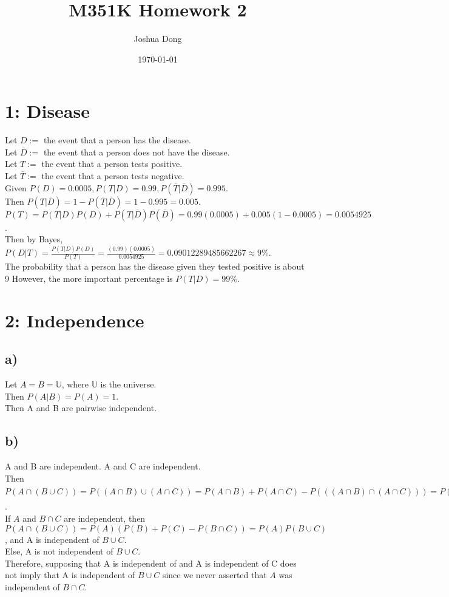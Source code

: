 \documentclass{article}
\begin{document}
\title{\vspace{-60px}M351K\: Homework 2}
\author{Joshua Dong}
\date{\today}
\maketitle

\section*{1: Disease}
Let $D :=$ the event that a person has the disease.
\\Let $\overline{D} :=$ the event that a person does not have the disease.
\\Let $T :=$ the event that a person tests positive.
\\Let $\overline{T} :=$ the event that a person tests negative.
\\Given $P(D) = 0.0005, P(T|D) = 0.99, P(\overline{T}|\overline{D}) = 0.995$.
\\Then $P(T|\overline{D}) =
1 - P(\overline{T}|\overline{D}) =
1 - 0.995 =
0.005$.
\\$P(T) =
P(T|D)P(D) + P(T|\overline{D})P(\overline{D}) =
0.99(0.0005) + 0.005(1 - 0.0005) =
0.0054925$.
\\Then by Bayes, $P(D|T) =
\frac{P(T|D)P(D)}{P(T)} =
\frac{(0.99)(0.0005)}{0.0054925} =
0.09012289485662267 \approx
9\%$.
\\The probability that a person has the disease given they tested positive is
about 9%
However, the more important percentage is $P(T|D) = 99\%$.

\section*{2: Independence}
\subsection*{a)}
Let $A = B = \mathbb{U}$, where $\mathbb{U}$ is the universe.
\\Then $P(A|B) = P(A) = 1$.
\\Then A and B are pairwise independent.

\subsection*{b)}
A and B are independent. A and C are independent.
\\Then $P(A \cap (B \cup C)) =
P((A \cap B) \cup (A \cap C)) =
P(A \cap B) + P(A \cap C) - P(((A \cap B) \cap (A \cap C))) =
P(A)P(B) + P(A)P(C) - P(A \cap B \cap C) =
P(A)(P(B) + P(C) - \frac{P(A \cap (B \cap C))}{P(A)})$.
\\If $A$ and $B \cap C$ are independent, then 
$P(A \cap (B \cup C)) =
P(A)(P(B) + P(C) - P(B \cap C)) =
P(A)P(B \cup C)$, and A is independent of $B \cup C$.
\\Else, A is not independent of $B \cup C$.
\\Therefore, supposing that A is independent of and A is independent of C
does not imply that A is independent of $B \cup C$ since we never asserted
that $A$ was independent of $B \cap C$.
\end{document}
